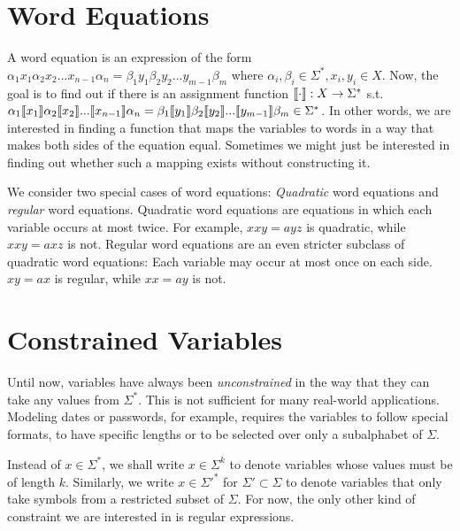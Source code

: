 \section{Word Equations}

A word equation is an expression of the form $\alpha_1x_1\alpha_2x_2...x_{n-1}\alpha_n = \beta_1y_1\beta_2y_2...y_{m-1}\beta_m$ where $\alpha_i, \beta_i \in \Sigma^*, x_i, y_i \in X$. Now, the goal is to find out if there is an assignment function $\llbracket \cdot \rrbracket: X \rightarrow \Sigma^*$ s.t. $\alpha_1\llbracket x_1 \rrbracket\alpha_2\llbracket x_2 \rrbracket...\llbracket x_{n-1} \rrbracket\alpha_n = \beta_1\llbracket y_1 \rrbracket\beta_2\llbracket y_2 \rrbracket...\llbracket y_{m-1} \rrbracket\beta_m \in \Sigma^*$. In other words, we are interested in finding a function that maps the variables to words in a way that makes both sides of the equation equal. Sometimes we might just be interested in finding out whether such a mapping exists without constructing it.

We consider two special cases of word equations: \textit{Quadratic} word equations and \textit{regular} word equations. Quadratic word equations are equations in which each variable occurs at most twice. For example, $xxy = ayz$ is quadratic, while $xxy = axz$ is not. Regular word equations are an even stricter subclass of quadratic word equations: Each variable may occur at most once on each side. $xy = ax$ is regular, while $xx = ay$ is not.

\section{Constrained Variables}
Until now, variables have always been \textit{unconstrained} in the way that they can take any values from $\Sigma^*$. This is not sufficient for many real-world applications. Modeling dates or passwords, for example, requires the variables to follow special formats, to have specific lengths or to be selected over only a subalphabet of $\Sigma$.

Instead of $x \in \Sigma^*$, we shall write $x \in \Sigma^k$ to denote variables whose values must be of length $k$. Similarly, we write $x \in \Sigma'^*$ for $\Sigma' \subset \Sigma$ to denote variables that only take symbols from a restricted subset of $\Sigma$.
For now, the only other kind of constraint we are interested in is regular expressions.


